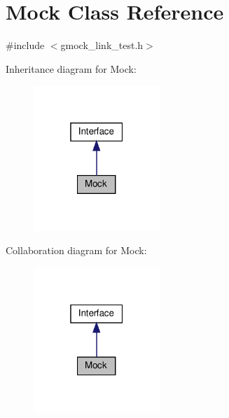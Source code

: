 \hypertarget{class_mock}{}\section{Mock Class Reference}
\label{class_mock}


{\ttfamily \#include $<$gmock\+\_\+link\+\_\+test.\+h$>$}



Inheritance diagram for Mock\+:
\nopagebreak
\begin{figure}[H]
\begin{center}
\leavevmode
\includegraphics[width=135pt]{class_mock__inherit__graph}
\end{center}
\end{figure}


Collaboration diagram for Mock\+:
\nopagebreak
\begin{figure}[H]
\begin{center}
\leavevmode
\includegraphics[width=135pt]{class_mock__coll__graph}
\end{center}
\end{figure}
